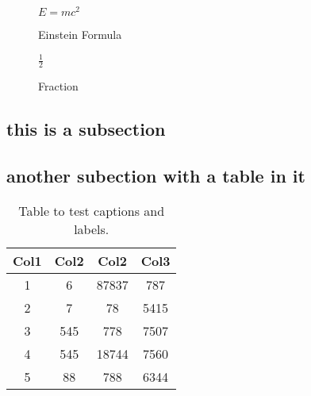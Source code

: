 \begin{figure}[ht]
    \centering
    \begin{math}
        E=mc^2 
    \end{math}
    \caption{Einstein Formula}
    \label{fig:Emc2}

\end{figure}

\begin{figure}[ht]
    \centering
    \begin{math}
        \frac{1}{2} 
    \end{math}
    \caption{Fraction}
    \label{fig:Fraction-1}

\end{figure}

\subsection{this is a subsection}

\lipsum[7-8]

\subsection{another subection with a table in it}


\begin{table}[h!]
\centering
\begin{tabular}{||c c c c||} 
 \hline
 Col1 & Col2 & Col2 & Col3 \\ [0.5ex] 
 \hline\hline
 1 & 6 & 87837 & 787 \\ 
 2 & 7 & 78 & 5415 \\
 3 & 545 & 778 & 7507 \\
 4 & 545 & 18744 & 7560 \\
 5 & 88 & 788 & 6344 \\ [1ex] 
 \hline
\end{tabular}
\caption{Table to test captions and labels.}
\label{table:1}
\end{table}

\newpage